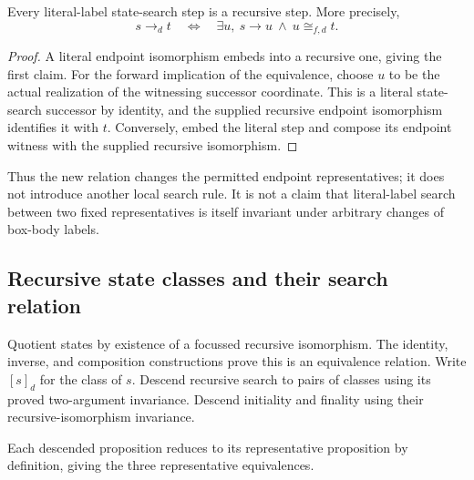 \begin{theorem}
Every literal-label state-search step is a recursive step. More precisely,
\[
 s\longrightarrow_d t\quad\Longleftrightarrow\quad
 \exists u,\ s\longrightarrow u\ \land\ u\cong_{f,d}t.
\]
\end{theorem}
\begin{proof}
A literal endpoint isomorphism embeds into a recursive one, giving the first
claim. For the forward implication of the equivalence, choose $u$ to be the
actual realization of the witnessing successor coordinate. This is a literal
state-search successor by identity, and the supplied recursive endpoint
isomorphism identifies it with $t$. Conversely, embed the literal step and
compose its endpoint witness with the supplied recursive isomorphism.
\end{proof}
Thus the new relation changes the permitted endpoint representatives; it does
not introduce another local search rule. It is not a claim that literal-label
search between two fixed representatives is itself invariant under arbitrary
changes of box-body labels.

\subsection{Recursive state classes and their search relation}
\begin{definition}
Quotient states by existence of a focussed recursive isomorphism. The identity,
inverse, and composition constructions prove this is an equivalence relation.
Write $[s]_d$ for the class of $s$. Descend recursive search to pairs of classes
using its proved two-argument invariance. Descend initiality and finality using
their recursive-isomorphism invariance.
\end{definition}
Each descended proposition reduces to its representative proposition by
definition, giving the three representative equivalences.

